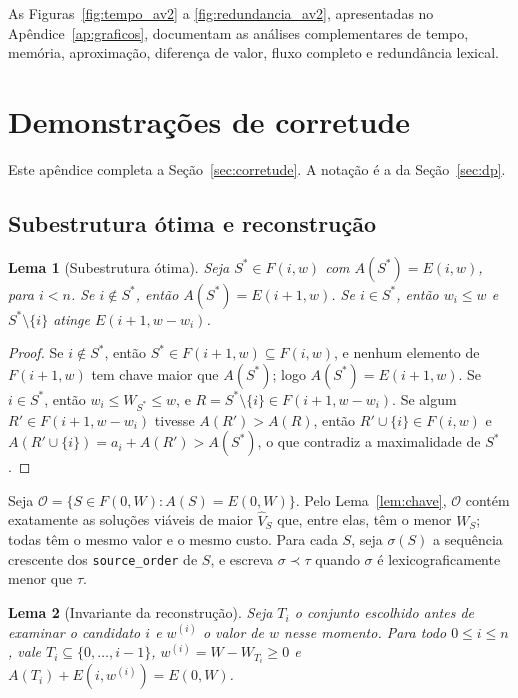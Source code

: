 \documentclass[11pt,a4paper]{article}
\theoremstyle{plain}
\newtheorem{lema}{Lema}
\theoremstyle{definition}
\theoremstyle{plain}
\begin{document}
As Figuras~\ref{fig:tempo_av2} a
\ref{fig:redundancia_av2}, apresentadas
no Apêndice~\ref{ap:graficos}, documentam
as análises complementares de tempo,
memória, aproximação, diferença de valor,
fluxo completo e redundância lexical.

\clearpage



\clearpage
\section{Demonstrações de corretude}
\label{ap:provas}

Este apêndice completa a Seção~\ref{sec:corretude}. A notação é a da
Seção~\ref{sec:dp}.

\subsection{Subestrutura ótima e reconstrução}

\begin{lema}[Subestrutura ótima]
\label{lem:subestrutura}
Seja $S^\ast\in F(i,w)$ com $A(S^\ast)=E(i,w)$, para $i<n$.
Se $i\notin S^\ast$, então $A(S^\ast)=E(i+1,w)$.
Se $i\in S^\ast$, então $w_i\le w$ e $S^\ast\setminus\{i\}$ atinge $E(i+1,w-w_i)$.
\end{lema}

\begin{proof}
Se $i\notin S^\ast$, então $S^\ast\in F(i+1,w)\subseteq F(i,w)$, e nenhum elemento de
$F(i+1,w)$ tem chave maior que $A(S^\ast)$; logo $A(S^\ast)=E(i+1,w)$.
Se $i\in S^\ast$, então $w_i\le W_{S^\ast}\le w$, e $R=S^\ast\setminus\{i\}\in F(i+1,w-w_i)$.
Se algum $R'\in F(i+1,w-w_i)$ tivesse $A(R')>A(R)$, então $R'\cup\{i\}\in F(i,w)$ e
$A(R'\cup\{i\})=a_i+A(R')>A(S^\ast)$, o que contradiz a maximalidade de $S^\ast$.
\end{proof}

Seja $\mathcal{O}=\{S\in F(0,W): A(S)=E(0,W)\}$. Pelo Lema~\ref{lem:chave}, $\mathcal{O}$
contém exatamente as soluções viáveis de maior $\hat{V}_S$ que, entre elas, têm o menor
$W_S$; todas têm o mesmo valor e o mesmo custo. Para cada $S$, seja $\sigma(S)$ a
sequência crescente dos \texttt{source\_order} de $S$, e escreva $\sigma\prec\tau$ quando
$\sigma$ é lexicograficamente menor que $\tau$.

\begin{lema}[Invariante da reconstrução]
\label{lem:invariante}
Seja $T_i$ o conjunto escolhido antes de examinar o candidato $i$ e $w^{(i)}$ o valor de $w$
nesse momento. Para todo $0\le i\le n$, vale $T_i\subseteq\{0,\dots,i-1\}$,
$w^{(i)}=W-W_{T_i}\ge 0$ e $A(T_i)+E(i,w^{(i)})=E(0,W)$.
\end{lema}
\end{document}
